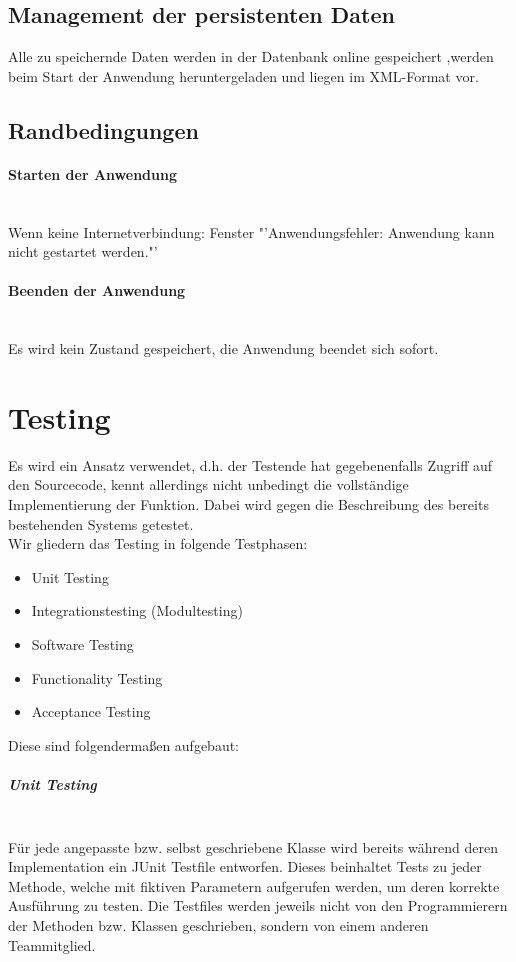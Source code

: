 \documentclass[10pt,a4paper]{article}
\newcommand{\G}[1]{\glqq\text{#1}\grqq} %
\begin{document}
\subsection{Management der persistenten Daten}
Alle zu speichernde Daten werden in der Datenbank online gespeichert ,werden beim Start der Anwendung heruntergeladen und liegen im XML-Format vor.
\subsection{Randbedingungen}
\paragraph{Starten der Anwendung}\ \\
Wenn keine Internetverbindung: Fenster "'Anwendungsfehler: Anwendung kann nicht gestartet werden."'
\paragraph{Beenden der Anwendung}\ \\
Es wird kein Zustand gespeichert, die Anwendung beendet sich sofort.
\section{Testing}
Es wird ein \G{Grey Box testing} Ansatz verwendet, d.h. der Testende hat gegebenenfalls Zugriff auf den Sourcecode, kennt allerdings nicht unbedingt die vollständige Implementierung der Funktion. Dabei wird gegen die Beschreibung des bereits bestehenden Systems getestet.\\
Wir gliedern das Testing in folgende Testphasen:
{\small\begin{itemize}
\item Unit Testing
\item Integrationstesting (Modultesting)
\item Software Testing
\item Functionality Testing
\item Acceptance Testing\\
\end{itemize}}
Diese sind folgendermaßen aufgebaut:
\subparagraph{Unit Testing}\ \\
Für jede angepasste bzw. selbst geschriebene Klasse wird bereits während deren Implementation ein JUnit Testfile entworfen. Dieses beinhaltet Tests zu jeder Methode, welche mit fiktiven Parametern aufgerufen werden, um deren korrekte Ausführung zu testen. Die Testfiles werden jeweils nicht von den Programmierern der Methoden bzw. Klassen geschrieben, sondern von einem anderen Teammitglied. 
\end{document}
